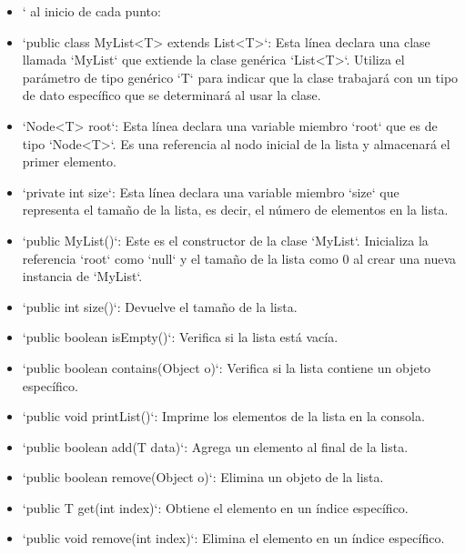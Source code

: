 \documentclass{article}
\begin{document}
		

	\begin{itemize}	

		\item` al inicio de cada punto:

		\item `public class MyList<T> extends List<T>`: Esta línea declara una clase llamada `MyList` que extiende la clase genérica `List<T>`. Utiliza el parámetro de tipo genérico `T` para indicar que la clase trabajará con un tipo de dato específico que se determinará al usar la clase.
		
		\item `Node<T> root`: Esta línea declara una variable miembro `root` que es de tipo `Node<T>`. Es una referencia al nodo inicial de la lista y almacenará el primer elemento.
		
		\item `private int size`: Esta línea declara una variable miembro `size` que representa el tamaño de la lista, es decir, el número de elementos en la lista.
		
		\item `public MyList()`: Este es el constructor de la clase `MyList`. Inicializa la referencia `root` como `null` y el tamaño de la lista como 0 al crear una nueva instancia de `MyList`.
		
		\item `public int size()`: Devuelve el tamaño de la lista.
		
		\item `public boolean isEmpty()`: Verifica si la lista está vacía.
		
		\item `public boolean contains(Object o)`: Verifica si la lista contiene un objeto específico.
		
		\item `public void printList()`: Imprime los elementos de la lista en la consola.
		
		\item `public boolean add(T data)`: Agrega un elemento al final de la lista.
		
		\item `public boolean remove(Object o)`: Elimina un objeto de la lista.
		
		\item `public T get(int index)`: Obtiene el elemento en un índice específico.
		
		\item `public void remove(int index)`: Elimina el elemento en un índice específico.

	\end{itemize}
\end{document}
